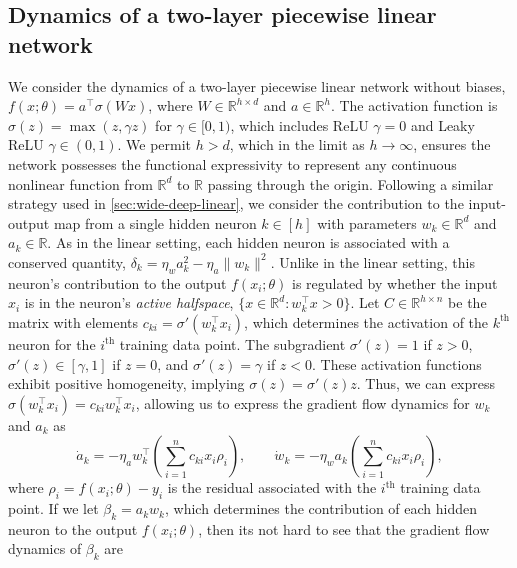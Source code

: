 \documentclass{article}
\theoremstyle{plain}
\theoremstyle{definition}
\theoremstyle{remark}
\begin{document}
\subsection{Dynamics of a two-layer piecewise linear network}
\label{app:nonlinear-two-layer}

We consider the dynamics of a two-layer piecewise linear network without biases, $f(x;\theta) = a^\intercal \sigma(W x)$, where $W \in \mathbb{R}^{h \times d}$ and $a \in \mathbb{R}^h$.
%
The activation function is $\sigma(z) = \max(z, \gamma z)$ for $\gamma \in [0,1)$, which includes ReLU $\gamma = 0$ and Leaky ReLU $\gamma \in (0,1)$.
%
We permit $h > d$, which in the limit as $h \to \infty$, ensures the network possesses the functional expressivity to represent any continuous nonlinear function from $\mathbb{R}^d$ to $\mathbb{R}$ passing through the origin.
%
Following a similar strategy used in \cref{sec:wide-deep-linear}, we consider the contribution to the input-output map from a single hidden neuron $k \in [h]$ with parameters $w_k \in \mathbb{R}^d$ and $a_k \in \mathbb{R}$.
%
As in the linear setting, each hidden neuron is associated with a conserved quantity, $\delta_k = \eta_w a_k^2 - \eta_a\|w_k\|^2$.
%
Unlike in the linear setting, this neuron's contribution to the output $f(x_i;\theta)$ is regulated by whether the input $x_i$ is in the neuron's \emph{active halfspace}, $\{x \in \mathbb{R}^d : w_k^\intercal x > 0\}$.
%
Let $C \in \mathbb{R}^{h \times n}$ be the matrix with elements $c_{ki} = \sigma'(w_k^\intercal x_i)$, which determines the activation of the $k^{\mathrm{th}}$ neuron for the $i^{\mathrm{th}}$ training data point.
%
The subgradient $\sigma'(z) = 1$ if $z > 0$, $\sigma'(z) \in [\gamma, 1]$ if $z = 0$, and $\sigma'(z) = \gamma$ if $z < 0$.
%
These activation functions exhibit positive homogeneity, implying $\sigma(z) = \sigma'(z) z$.
%
Thus, we can express $\sigma(w_k^\intercal x_i) = c_{ki}w_k^\intercal x_i$, allowing us to express the gradient flow dynamics for $w_k$ and $a_k$ as
\begin{equation}
    \label{eq:nonlinear-gradient-flow-a-w}
    \dot{a}_k = -\eta_a w_k^\intercal \left(\sum_{i=1}^nc_{ki}x_i\rho_i\right), \qquad \dot{w}_k = -\eta_w a_k \left(\sum_{i=1}^nc_{ki}x_i\rho_i\right),
\end{equation}
where $\rho_i = f(x_i;\theta) - y_i$ is the residual associated with the $i^{\mathrm{th}}$ training data point.
%
If we let $\beta_k = a_kw_k$, which determines the contribution of each hidden neuron to the output $f(x_i;\theta)$, then its not hard to see that the gradient flow dynamics of $\beta_k$ are
\end{document}
